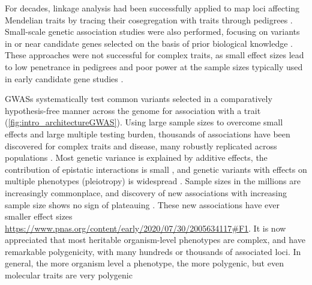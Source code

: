 \begin{outline}
\1 For decades, linkage analysis had been successfully applied to map loci affecting Mendelian traits by tracing their cosegregation with traits through pedigrees \autocite{visscher2012FiveYearsGWAS}.
Small-scale genetic association studies were also performed, focusing on variants in or near candidate genes selected on the basis of prior biological knowledge \autocite{hirschhorn2002ComprehensiveReviewGenetic}.
These approaches were not successful for complex traits, as small effect sizes lead to low penetrance in pedigrees \autocite{visscher2012FiveYearsGWAS}
and poor power at the sample sizes typically used in early candidate gene studies \autocite{border2019NoSupportHistorical}.

\1 \Glspl{GWAS} systematically test common variants selected in a comparatively hypothesis-free manner across the genome for association with a trait (\autoref{fig:intro_architectureGWAS}).
Using large sample sizes to overcome small effects and large multiple testing burden, thousands of associations have been discovered for complex traits and disease,
many robustly replicated across populations \autocite{visscher2012FiveYearsGWAS,visscher201710YearsGWAS}.
Most genetic variance is explained by additive effects, the contribution of epistatic interactions is small \autocite{visscher2019Fisher1918Paper}, 
and genetic variants with effects on multiple phenotypes (pleiotropy) is widespread \autocite{visscher2012FiveYearsGWAS}.
Sample sizes in the millions are increasingly commonplace, 
and discovery of new associations with increasing sample size shows no sign of plateauing \autocite{tam2019BenefitsLimitationsGenomewide}.
    \2 These new associations have ever smaller effect sizes \url{https://www.pnas.org/content/early/2020/07/30/2005634117#F1}.
It is now appreciated that most heritable organism-level phenotypes are complex, and have remarkable polygenicity, with many hundreds or thousands of associated loci.
    \2 In general, the more organism level a phenotype, the more polygenic, but even molecular traits are very polygenic


\end{outline}
